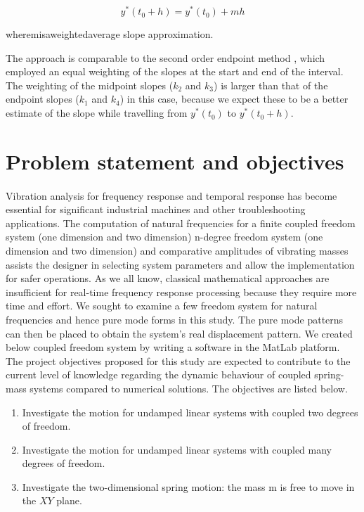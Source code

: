 \begin{equation}
   {y^*}({t_0} + h) =  {y^*}({t_0}) + mh
\end{equation}

 {\rm{where\;}}m{\rm{\;is\;a\;weighted\;average\; slope\; approximation.}}

The approach is comparable to the second order endpoint method \cite{dontchev2000second}, which employed an equal weighting of the slopes at the start and end of the interval. The weighting of the midpoint slopes ($k_2$ and $k_3$) is larger than that of the endpoint slopes ($k_1$ and $k_4$) in this case, because we expect these to be a better estimate of the slope while travelling from $y^*(t_0)$ to $y^*(t_0+h)$.


\newpage
\section{Problem statement and objectives}
\paragraph{}
Vibration analysis for frequency response and temporal response has become essential for significant industrial machines and other troubleshooting applications. The computation of natural frequencies for a finite coupled freedom system (one dimension and two dimension)  n-degree freedom system (one dimension and two dimension) and comparative amplitudes of vibrating masses assists the designer in selecting system parameters and allow the implementation for safer operations. As we all know, classical mathematical approaches are insufficient for real-time frequency response processing because they require more time and effort. We sought to examine a few freedom system for natural frequencies and hence pure mode forms in this study. The pure mode patterns can then be placed to obtain the system's real displacement pattern. We created below coupled freedom system by writing a software in the MatLab platform. The project objectives proposed for this study are expected to contribute to the current level of knowledge regarding the dynamic behaviour of coupled spring-mass systems compared to numerical solutions. The objectives
are listed below.

\begin{enumerate}
    \item Investigate the motion for undamped linear systems with  coupled two degrees of freedom.
    \item Investigate the motion for undamped linear systems with coupled many degrees of freedom. 
    \item Investigate the two-dimensional spring motion: the mass
m is free to move in the $XY$ plane. 
\end{enumerate}




